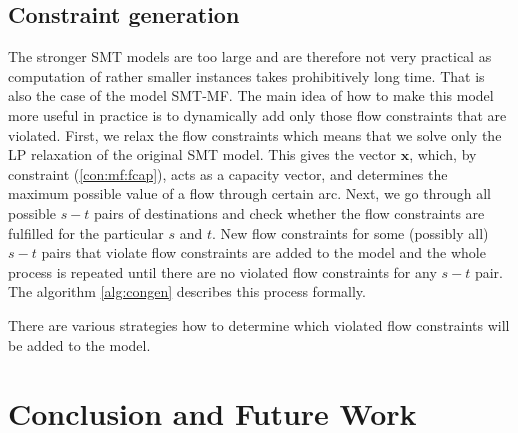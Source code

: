 \subsection{Constraint generation}
The stronger SMT models are too large and are therefore not very practical as computation of rather smaller instances takes prohibitively long time. That is also the case of the model SMT-MF. The main idea of how to make this model more useful in practice is to dynamically add only those flow constraints that are violated. First, we relax the flow constraints which means that we solve only the LP relaxation of the original SMT model. This gives the vector $\mathbf{x}$, which, by constraint (\ref{con:mf:fcap}), acts as a capacity vector, and determines the maximum possible value of a flow through certain arc. Next, we go through all possible $s-t$ pairs of destinations and check whether the flow constraints are fulfilled for the particular $s$ and $t$. New flow constraints for some (possibly all) $s-t$ pairs that violate flow constraints are added to the model and the whole process is repeated until there are no violated flow constraints for any $s-t$ pair. The algorithm \ref{alg:congen} describes this process formally.

There are various strategies how to determine which violated flow constraints will be added to the model. 

\section{Conclusion and Future Work}
\label{sec:conclusion}

